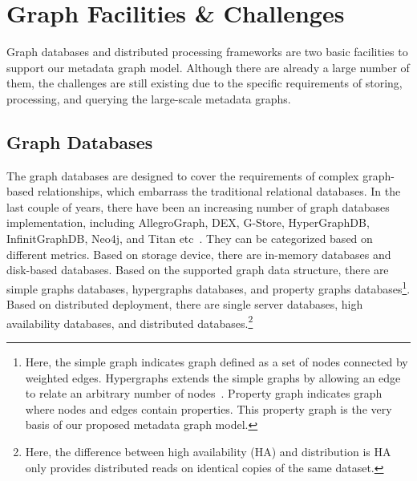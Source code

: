 \section{Graph Facilities \& Challenges}

Graph databases and distributed processing frameworks are two basic facilities to support our metadata graph model. Although there are already a large number of them, the challenges are still existing due to the specific requirements of storing, processing, and querying the large-scale metadata graphs.

\subsection{Graph Databases}
The graph databases are designed to cover the requirements of complex graph-based relationships, which embarrass the traditional relational databases. In the last couple of years, there have been an increasing number of graph databases implementation, including AllegroGraph, DEX, G-Store, HyperGraphDB, InfinitGraphDB, Neo4j, and Titan etc~\cite{allegrograph, dex, steinhaus2010g,  iordanov2010hypergraphdb, igraph, webber2012programmatic, titan}. They can be categorized based on different metrics. Based on storage device, there are in-memory databases and disk-based databases. Based on the supported graph data structure, there are {simple graphs} databases, {hypergraphs} databases, and {property graphs} databases\footnote{Here, the simple graph indicates graph defined as a set of nodes connected by weighted edges. Hypergraphs extends the simple graphs by allowing an edge to relate an arbitrary number of nodes~\cite{berge1973graphs}. Property graph indicates graph where nodes and edges contain properties. This property graph is the very basis of our proposed metadata graph model.}. Based on distributed deployment, there are single server databases, high availability databases, and distributed databases.\footnote{Here, the difference between high availability (HA) and distribution is HA only provides distributed reads on identical copies of the same dataset.}

